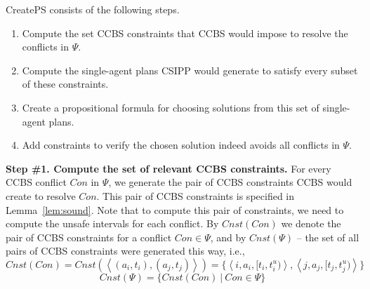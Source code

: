 \documentclass[review]{elsarticle}
\newcommand{\tuple}[1]{\ensuremath{\left \langle #1 \right \rangle }}
\newcommand\konstantin[1]{\nb{\textbf{Konstantin:}}{red}{#1}}
\newcommand{\ccbs}{\ac{CCBS}\xspace}
\newcommand{\csipp}{\ac{CSIPP}\xspace}
\newcommand{\ps}{\ac{PS}\xspace}
\begin{document}


CreatePS consists of the following steps. 
\begin{enumerate}
	\item Compute the set \ccbs constraints that \ccbs would impose to resolve the conflicts in $\Psi$. 
	\item Compute the single-agent plans \csipp would generate to satisfy every subset of these constraints. %
	\item Create a propositional formula for choosing solutions from this set of single-agent plans. 
	\item Add constraints to verify the chosen solution indeed avoids all conflicts in $\Psi$. 
\end{enumerate}



\noindent \textbf{Step \#1. Compute the set of relevant \ccbs constraints.}
For every \ccbs conflict $Con$ in $\Psi$, we generate the pair of \ccbs constraints \ccbs would create to resolve $Con$. 
This pair of \ccbs constraints is specified in Lemma~\ref{lem:sound}. 
Note that to compute this pair of constraints, we need to compute the unsafe intervals for each conflict. 
By $Cnst(Con)$ we denote the pair of \ccbs constraints for a conflict $Con\in \Psi$, 
and by $Cnst(\Psi)$ -- the set of all pairs of \ccbs constraints were generated this way, i.e., 
\begin{equation}
Cnst(Con) = Cnst(\tuple{ (a_i, t_i), (a_j,t_j) }) = \{ \tuple{i, a_i, [t_i, t_i^u)}, \tuple{j, a_j, [t_j, t_j^u)} \}
\end{equation}
\begin{equation}
Cnst(\Psi) = \{ Cnst(Con)~|~Con\in \Psi\} 
\end{equation}

\end{document}
